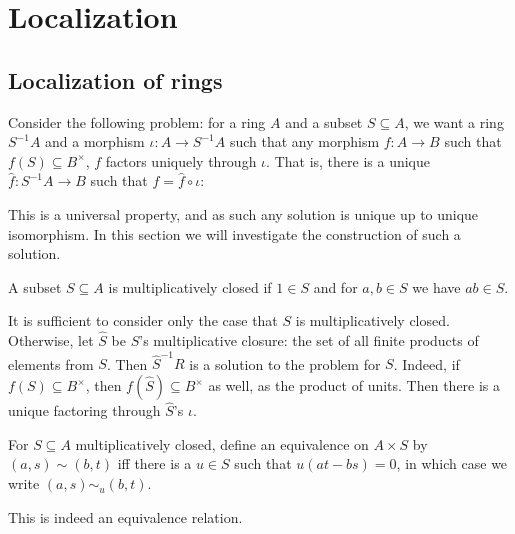 \section{Localization}

\subsection{Localization of rings}

Consider the following problem: for a ring $A$ and a subset $S\subseteq A$, we want a ring $S^{-1}A$ and a morphism $\iota\colon A\to S^{-1}A$
such that any morphism $f\colon A\to B$ such that $f(S)\subseteq B^\times$, $f$ factors uniquely through $\iota$.
That is, there is a unique $\hat f\colon S^{-1}A\to B$ such that $f=\hat f\circ\iota$:

\centerline{}

This is a universal property, and as such any solution is unique up to unique isomorphism.
In this section we will investigate the construction of such a solution.

\bdefn

    A subset $S\subseteq A$ is {\emphcolor multiplicatively closed} if $1\in S$ and for $a,b\in S$ we have $ab\in S$.

\edefn

It is sufficient to consider only the case that $S$ is multiplicatively closed.
Otherwise, let $\hat S$ be $S$'s multiplicative closure: the set of all finite products of elements from $S$.
Then $\hat S^{-1}R$ is a solution to the problem for $S$.
Indeed, if $f(S)\subseteq B^\times$, then $f(\hat S)\subseteq B^\times$ as well, as the product of units.
Then there is a unique factoring through $\hat S$'s $\iota$.

\bdefn

    For $S\subseteq A$ multiplicatively closed, define an equivalence on $A\times S$ by $(a,s)\sim(b,t)$ iff there is a
    $u\in S$ such that $u(at-bs)=0$, in which case we write $(a,s)\sim_u(b,t)$.

\edefn

\blemm

    This is indeed an equivalence relation.

\elemm

\bproof

